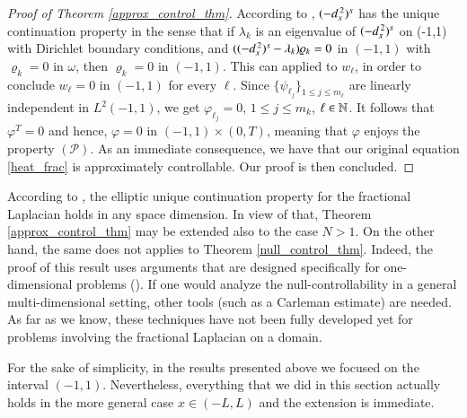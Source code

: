 \begin{proof}[Proof of Theorem \ref{approx_control_thm}]
According to \cite[Theorem 1.4]{fall2014unique}, $(-d_x^{\,2})^{s}$ has the unique continuation property in the sense that if $\lambda_k$ is an eigenvalue of $(-d_x^{\,2})^{s}$ on (-1,1) with Dirichlet boundary conditions, and $((-d_x^{\,2})^{s}-\lambda_k)\varrho_k = 0$ in $(-1,1)$ with $\varrho_k = 0$ in $\omega$, then $\varrho_k = 0$ in $(-1,1)$. 
This can applied to $w_{\ell}$, in order to conclude $w_{\ell} = 0$ in $(-1,1)$ for every $\ell$. Since $\{\psi_{\ell_j}\}_{1\leq j\leq m_{\ell}}$ are linearly independent in $L^2(-1,1)$, we get $\varphi_{\ell_j} = 0$, $1\leq j\leq m_k$, $\ell\in\mathbb{N}$. It follows that $\varphi^T=0$ and hence, $\varphi=0$ in $(-1,1)\times(0,T)$, meaning that $\varphi$ enjoys the property $(\mathcal{P})$. As an immediate consequence, we have that our original equation \eqref{heat_frac} is approximately controllable. Our proof is then concluded. 
\end{proof}

\begin{remark}
According to \cite{fall2014unique}, the elliptic unique continuation property for the fractional Laplacian holds in any space dimension. In view of that, Theorem \ref{approx_control_thm} may be extended also to the case $N>1$. On the other hand, the same does not applies to Theorem \eqref{null_control_thm}. Indeed, the proof of this result uses arguments that are designed specifically for one-dimensional problems (\cite{fattorini1971exact}). If one would analyze the null-controllability in a general multi-dimensional setting, other tools (such as a Carleman estimate) are needed. As far as we know, these techniques have not been fully developed yet for problems involving the fractional Laplacian on a domain. 
\end{remark}

\begin{remark}
For the sake of simplicity, in the results presented above we focused on the interval $(-1,1)$. Nevertheless, everything that we did in this section actually holds in the more general case $x\in(-L,L)$ and the extension is immediate.
\end{remark}



